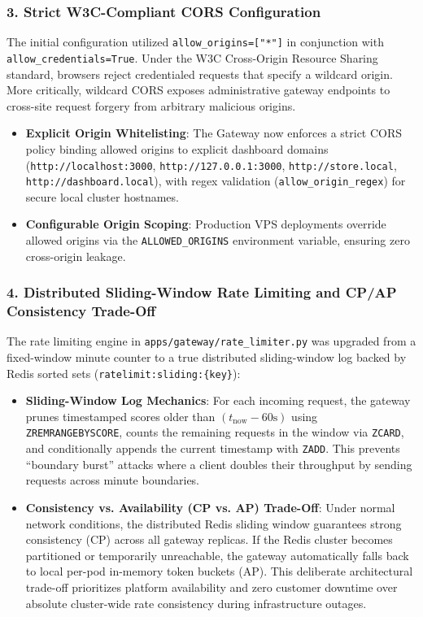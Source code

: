 \documentclass[11pt,a4paper]{article}
\begin{document}
\subsubsection{3. Strict W3C-Compliant CORS Configuration}
The initial configuration utilized \texttt{allow\_origins=["*"]} in conjunction with \texttt{allow\_credentials=True}. Under the W3C Cross-Origin Resource Sharing standard, browsers reject credentialed requests that specify a wildcard origin. More critically, wildcard CORS exposes administrative gateway endpoints to cross-site request forgery from arbitrary malicious origins.
\begin{itemize}[leftmargin=*]
    \item \textbf{Explicit Origin Whitelisting}: The Gateway now enforces a strict CORS policy binding allowed origins to explicit dashboard domains (\texttt{http://localhost:3000}, \texttt{http://127.0.0.1:3000}, \texttt{http://store.local}, \texttt{http://dashboard.local}), with regex validation (\texttt{allow\_origin\_regex}) for secure local cluster hostnames.
    \item \textbf{Configurable Origin Scoping}: Production VPS deployments override allowed origins via the \texttt{ALLOWED\_ORIGINS} environment variable, ensuring zero cross-origin leakage.
\end{itemize}

\subsubsection{4. Distributed Sliding-Window Rate Limiting and CP/AP Consistency Trade-Off}
The rate limiting engine in \texttt{apps/gateway/rate\_limiter.py} was upgraded from a fixed-window minute counter to a true distributed sliding-window log backed by Redis sorted sets (\texttt{ratelimit:sliding:\{key\}}):
\begin{itemize}[leftmargin=*]
    \item \textbf{Sliding-Window Log Mechanics}: For each incoming request, the gateway prunes timestamped scores older than $(t_{\text{now}} - 60\text{s})$ using \texttt{ZREMRANGEBYSCORE}, counts the remaining requests in the window via \texttt{ZCARD}, and conditionally appends the current timestamp with \texttt{ZADD}. This prevents ``boundary burst'' attacks where a client doubles their throughput by sending requests across minute boundaries.
    \item \textbf{Consistency vs. Availability (CP vs. AP) Trade-Off}: Under normal network conditions, the distributed Redis sliding window guarantees strong consistency (CP) across all gateway replicas. If the Redis cluster becomes partitioned or temporarily unreachable, the gateway automatically falls back to local per-pod in-memory token buckets (AP). This deliberate architectural trade-off prioritizes platform availability and zero customer downtime over absolute cluster-wide rate consistency during infrastructure outages.
\end{itemize}
\end{document}

